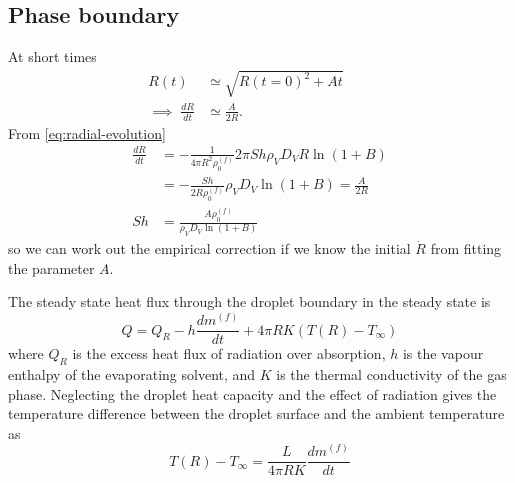 \documentclass[11pt,twoside]{report}
\begin{document}
\subsection{Phase boundary}

At short times
\begin{subequations}
  \begin{align}
    R(t) &\simeq \sqrt{R(t=0)^2 + A t} \qquad \\
    \implies \; \frac{dR}{dt} &\simeq \frac{A}{2R}.
  \end{align}
\end{subequations}
From \eqref{eq:radial-evolution}
\begin{equation}
  \begin{aligned}
  \frac{dR}{dt} &=
  -\frac{1}{4\pi R^2 \rho^{(f)}_0}
  2\pi Sh \rho_V D_V R \ln{(1 + B)} \\
  &=
  -\frac{Sh}{2 R \rho^{(f)}_0}
  \rho_V D_V \ln{(1 + B)} =
  \frac{A}{2 R} \\
  Sh &= \frac{A \rho^{(f)}_0}{\rho_V D_V \ln{(1+B)}}
  \end{aligned}
\end{equation}
so we can work out the empirical correction if we know the initial $\dot{R}$ from fitting the parameter $A$.

The steady state heat flux through the droplet boundary in the steady state is \cite{Kulmala1993,Rovelli2016}
\begin{equation}
  Q = Q_R - h \frac{dm^{(f)}}{dt} + 4\pi R K (T(R) - T_\infty)
\end{equation}
where $Q_R$ is the excess heat flux of radiation over absorption, $h$ is the vapour enthalpy of the evaporating solvent, and $K$ is the thermal conductivity of the gas phase.
Neglecting the droplet heat capacity and the effect of radiation gives the temperature difference between
the droplet surface and the ambient temperature as \cite{Kulmala1993,Rovelli2016}
\begin{equation}
  T(R) - T_\infty = \frac{L}{4\pi R K} \frac{dm^{(f)}}{dt}
\end{equation}
\end{document}
